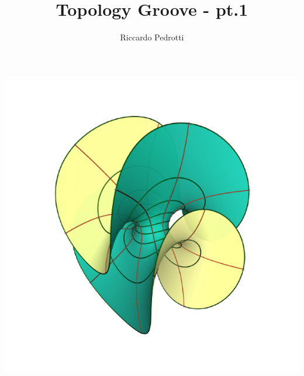 \documentclass[10pt,a4paper]{article}
\author{Riccardo Pedrotti}
\title{Topology Groove - pt.1}
\theoremstyle{definition}
\theoremstyle{plain}
\theoremstyle{remark}
\theoremstyle{remark}
\begin{document}
\maketitle
\vspace{2 cm}
\begin{center}
\includegraphics[scale=0.7]{enneper.png} 
\end{center}

\newpage


%
%
%
%
\end{document}

